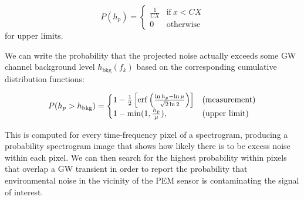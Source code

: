 \begin{equation}
	P(h_p) =
		\begin{cases}
      \frac{1}{CX} & \text{if}\ x < CX\\
      0 & \text{otherwise}
    \end{cases}
\end{equation}
for upper limits.

We can write the probability that the projected noise actually exceeds some \ac{GW} channel background level $h_{\text{bkg}}(f_k)$ based on the corresponding cumulative distribution functions:

\begin{equation}
	P(h_p > h_{\text{bkg}}) =
		\begin{cases}
			1 - \frac{1}{2} \left[ \erf \left( \frac{\ln h_p - \ln \mu}{\sqrt{2} \ln 2} \right) \right] & \text{(measurement)}\\
			1 - \min(1, \frac{h_p}{\mu}), & \text{(upper limit)}
		\end{cases}
\end{equation}

This is computed for every time-frequency pixel of a spectrogram, producing a probability spectrogram image that shows how likely there is to be excess noise within each pixel.
We can then search for the highest probability within pixels that overlap a \ac{GW} transient in order to report the probability that environmental noise in the vicinity of the \ac{PEM} sensor is contaminating the signal of interest.

